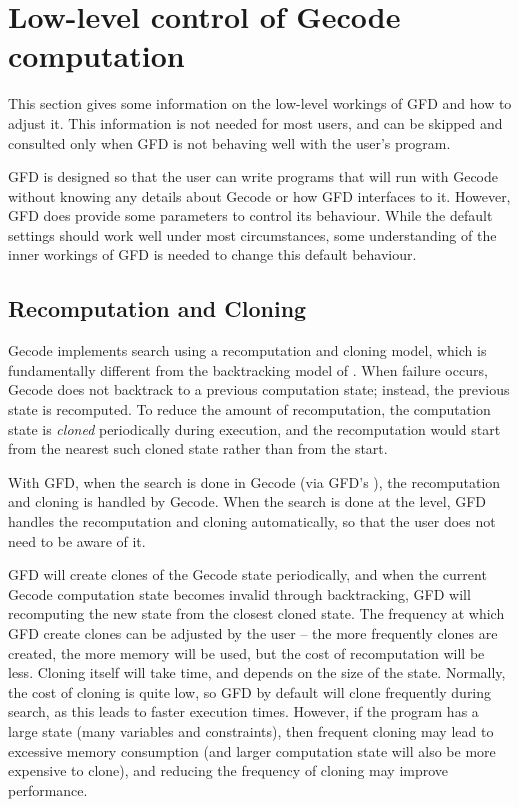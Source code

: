 \section{Low-level control of Gecode computation}
This section gives some information on the low-level workings of GFD and how
to adjust it. This information is not needed for most users, and can be 
skipped and consulted only when GFD is not behaving well with the user's
program.

GFD is designed so that the user can write programs that will run with
 Gecode without knowing any details about Gecode or how GFD interfaces
 to it. However, GFD does provide some parameters to control its behaviour.
While the default settings should work well under most circumstances, some
understanding of the inner workings of GFD is needed to change this default
behaviour. 

\subsection{Recomputation and Cloning}


Gecode implements search using a recomputation and cloning model,
which is fundamentally different from the backtracking model of \eclipse.
When failure occurs, Gecode does not backtrack to a previous computation
state; instead, the previous state is recomputed. To reduce the amount
of recomputation, the computation state is {\it cloned\/} periodically
during execution, and the recomputation would start from the nearest
such cloned state rather than from the start.

With GFD, when the search is done in Gecode (via GFD's 
), the
recomputation and cloning is handled by Gecode. When the search is done
at the {\eclipse} level, GFD handles the recomputation and cloning automatically,
so that the user does not need to be aware of it.

GFD will create clones of the Gecode state periodically, and when the
current Gecode computation state becomes invalid through {\eclipse} backtracking,
GFD will recomputing the new state from the closest cloned state. 
The frequency at which GFD create clones can be adjusted by the user --
the more frequently clones are created, the more memory will be used, but
the cost of recomputation will be less. Cloning itself will take time,
and depends on the size of the state. Normally, the cost of cloning is
quite low, so GFD by default will clone frequently during search, as 
this leads to faster execution times. However, if the program has a large
state (many variables and constraints), then frequent cloning may lead to
excessive memory consumption (and larger computation state will also be 
more expensive to clone), and reducing the frequency of cloning may
improve performance.


